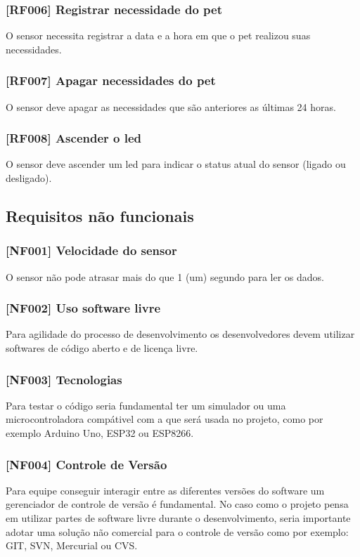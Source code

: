\documentclass[12pt,a4paper]{article}
\begin{document}
\subsubsection{[RF006] Registrar necessidade do pet}
O sensor necessita registrar a data e a hora em que o pet realizou suas
necessidades.

\subsubsection{[RF007] Apagar necessidades do pet}
O sensor deve apagar as necessidades que são anteriores as últimas 24 horas.

\subsubsection{[RF008] Ascender o led}
O sensor deve ascender um led para indicar o status atual do sensor (ligado ou
desligado).

\subsection{Requisitos não funcionais}

\subsubsection{[NF001] Velocidade do sensor}
O sensor não pode atrasar mais do que 1 (um) segundo para ler os dados.

\subsubsection{[NF002] Uso software livre}
Para agilidade do processo de desenvolvimento os desenvolvedores devem utilizar
softwares de código aberto e de licença livre.

\subsubsection{[NF003] Tecnologias}
Para testar o código seria fundamental ter um simulador ou uma
\gls{microcontroladora} compátivel com a que será usada no projeto, como por exemplo
Arduino Uno, ESP32 ou ESP8266.

\subsubsection{[NF004] Controle de Versão}
Para equipe conseguir interagir entre as diferentes versões do software um
gerenciador de controle de versão é fundamental. No caso como o projeto pensa
em utilizar partes de software livre durante o desenvolvimento, seria
importante adotar uma solução não comercial para o controle de versão como por
exemplo: GIT, SVN, Mercurial ou CVS.
\end{document}
